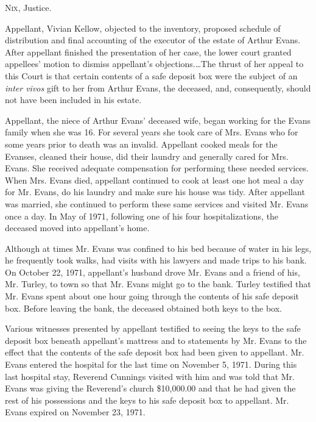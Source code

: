 
\opinion \textsc{Nix}, Justice.

Appellant, Vivian Kellow, objected to the inventory, proposed schedule of
distribution and final accounting of the executor of the estate of Arthur
Evans. After appellant finished the presentation of her case, the lower court
granted appellees' motion to dismiss appellant's objections.\dots The thrust
of her appeal to this Court is that certain contents of a safe deposit box were
the subject of an \textit{inter vivos} gift to her from Arthur Evans, the
deceased, and, consequently, should not have been included in his estate. 

Appellant, the niece of Arthur Evans' deceased wife, began working for the Evans
family when she was 16. For several years she took care of Mrs. Evans who for
some years prior to death was an invalid. Appellant cooked meals for the
Evanses, cleaned their house, did their laundry and generally cared for Mrs.
Evans. She received adequate compensation for performing these needed services.
When Mrs. Evans died, appellant continued to cook at least one hot meal a day
for Mr. Evans, do his laundry and make sure his house was tidy. After appellant
was married, she continued to perform these same services and visited Mr. Evans
once a day. In May of 1971, following one of his four hospitalizations, the
deceased moved into appellant's home. 

Although at times Mr. Evans was confined to his bed because of water in his
legs, he frequently took walks, had visits with his lawyers and made trips to
his bank. On October 22, 1971, appellant's husband drove Mr. Evans and a friend
of his, Mr. Turley, to town so that Mr. Evans might go to the bank. Turley
testified that Mr. Evans spent about one hour going through the contents of his
safe deposit box. Before leaving the bank, the deceased obtained both keys to
the box. 

Various witnesses presented by appellant testified to seeing the keys to the
safe deposit box beneath appellant's mattress and to statements by Mr. Evans to
the effect that the contents of the safe deposit box had been given to
appellant. Mr. Evans entered the hospital for the last time on November 5,
1971. During this last hospital stay, Reverend Cunnings visited with him and
was told that Mr. Evans was giving the Reverend's church \$10,000.00 and that
he had given the rest of his possessions and the keys to his safe deposit box
to appellant. Mr. Evans expired on November 23, 1971. 

